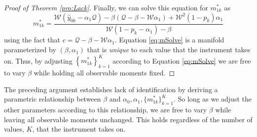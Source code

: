 \begin{proof}[Proof of Theorem \ref{pro:Lack}]
Finally, we can solve this equation for $m^*_{1k}$ as
\begin{equation}
  m^*_{1k} = \frac{\mathcal{W}(\hat{y}_{0k}-\alpha_1 \mathcal{Q}) - \beta(\mathcal{Q}-\beta-\mathcal{W}\alpha_1) + \mathcal{W}^2(1-p_k)\alpha_1}{\mathcal{W}(1-p_k - \alpha_1) - \beta}
  \label{eq:mSolve}
\end{equation}
using the fact that $c = \mathcal{Q} - \beta - \mathcal{W}\alpha_1$.
Equation \ref{eq:mSolve} is a manifold parameterized by $(\beta,\alpha_1)$ that is \emph{unique} to each value that the instrument takes on. 
Thus, by adjusting $\left\{ m^*_{1k} \right\}_{k=1}^K$ according to Equation \ref{eq:mSolve} we are free to vary $\beta$ while holding all observable moments fixed. 
\end{proof}
The preceding argument establishes lack of identification by deriving a parametric relationship between $\beta$ and $\alpha_0, \alpha_1, \{m^*_{1k}\}_{k=1}^K$.
So long as we adjust the other parameters according to this relationship, we are free to vary $\beta$ while leaving all observable moments unchanged.
This holds regardless of the number of values, $K$, that the instrument takes on.




